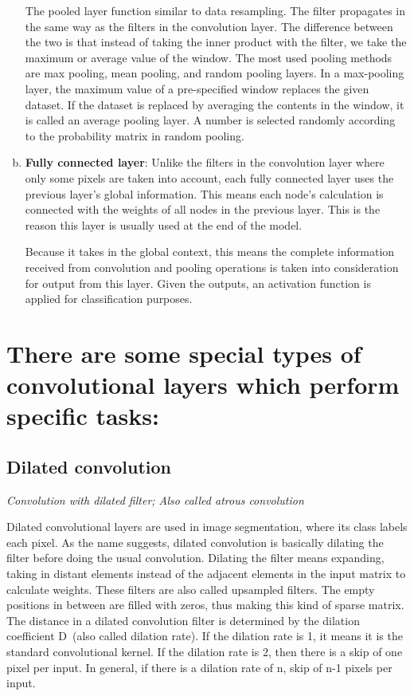 \begin{enumerate}[(a)]
        The pooled layer function similar to data resampling. The filter propagates in the same way as the filters in the convolution layer. The difference between the two is that instead of taking the inner product with the filter, we take the maximum or average value of the window. The most used pooling methods are max pooling, mean pooling, and random pooling layers. In a max-pooling layer, the maximum value of a pre-specified window replaces the given dataset. If the dataset is replaced by averaging the contents in the window, it is called an average pooling layer. A number is selected randomly according to the probability matrix in random pooling.

    \item \textbf{Fully connected layer}:
        Unlike the filters in the convolution layer where only some pixels are taken into account, each fully connected layer uses the previous layer's global information. This means each node’s calculation is connected with the weights of all nodes in the previous layer. This is the reason this layer is usually used at the end of the model. 

        Because it takes in the global context, this means the complete information received from convolution and pooling operations is taken into consideration for output from this layer. Given the outputs, an activation function is applied for classification purposes.
\end{enumerate}

\section*{There are some special types of convolutional layers which perform specific tasks:}
\subsection{Dilated convolution}
\label{sec:Dilated_Convolution}
\textit{Convolution with dilated filter; Also called atrous convolution}

    Dilated convolutional layers are used in image segmentation, where its class labels each pixel. As the name suggests, dilated convolution is basically dilating the filter before doing the usual convolution. Dilating the filter means expanding, taking in distant elements instead of the adjacent elements in the input matrix to calculate weights. These filters are also called upsampled filters. The empty positions in between are filled with zeros, thus making this kind of sparse matrix. The distance in a dilated convolution filter is determined by the dilation coefficient D~(also called dilation rate). If the dilation rate is 1, it means it is the standard convolutional kernel. If the dilation rate is 2, then there is a skip of one pixel per input. In general, if there is a dilation rate of n, skip of n-1 pixels per input.
    
